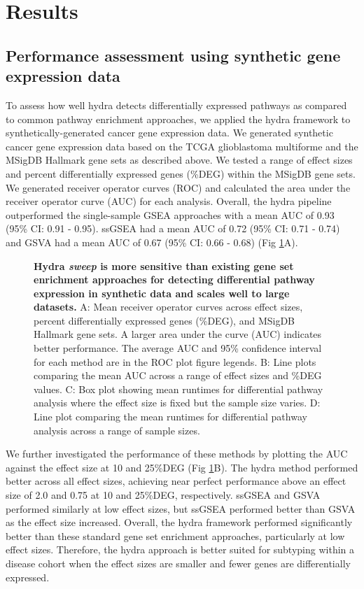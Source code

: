 \documentclass[10pt,letterpaper]{article}
\begin{document}
\section*{Results}
\subsection*{Performance assessment using synthetic gene expression data}
To assess how well hydra detects differentially expressed pathways as compared to common pathway enrichment approaches, we applied the hydra framework to synthetically-generated cancer gene expression data. We generated synthetic cancer gene expression data based on the TCGA glioblastoma multiforme and the MSigDB Hallmark gene sets as described above. We tested a range of effect sizes and percent differentially expressed genes (\%DEG) within the MSigDB gene sets. We generated receiver operator curves (ROC) and calculated the area under the receiver operator curve (AUC) for each analysis. Overall, the hydra pipeline outperformed the single-sample GSEA approaches with a mean AUC of 0.93 (95\% CI: 0.91 - 0.95). ssGSEA had a mean AUC of 0.72 (95\% CI: 0.71 - 0.74) and GSVA had a mean AUC of 0.67 (95\% CI: 0.66 - 0.68) (Fig \ref{rocplot}A).

\begin{figure}[!h]
	\caption{{\bf Hydra \textit{sweep} is more sensitive than existing gene set enrichment approaches for detecting differential pathway expression in synthetic data and scales well to large datasets.}
		A: Mean receiver operator curves across effect sizes, percent differentially expressed genes (\%DEG), and MSigDB Hallmark gene sets. A larger area under the curve (AUC) indicates better performance. The average AUC and 95\% confidence interval for each method are in the ROC plot figure legends. B: Line plots comparing the mean AUC across a range of effect sizes and \%DEG values. C: Box plot showing mean runtimes for differential pathway analysis where the effect size is fixed but the sample size varies. D: Line plot comparing the mean runtimes for differential pathway analysis across a range of sample sizes.
		\label{rocplot}}
\end{figure}

We further investigated the performance of these methods by plotting the AUC against the effect size at 10 and 25\%DEG (Fig \ref{rocplot}B). The hydra method performed better across all effect sizes, achieving near perfect performance above an effect size of 2.0 and 0.75 at 10 and 25\%DEG, respectively. ssGSEA and GSVA performed similarly at low effect sizes, but ssGSEA performed better than GSVA as the effect size increased. Overall, the hydra framework performed significantly better than these standard gene set enrichment approaches, particularly at low effect sizes. Therefore, the hydra approach is better suited for subtyping within a disease cohort when the effect sizes are smaller and fewer genes are differentially expressed.
\end{document}
